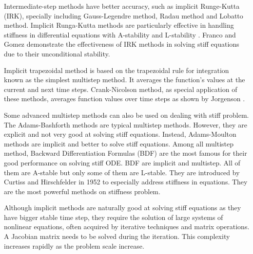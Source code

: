Intermediate-step methods have better accuracy, such as implicit Runge-Kutta (IRK), specially including Gauss-Legendre method, Radau method and Lobatto method. Implicit Runga-Kutta methods are particularly effective in handling stiffness in differential equations with A-stability and L-stability \cite{alamri2022very,franco1997two}. Franco and Gomez \cite{franco1997two} demonstrate the effectiveness of IRK methods in solving stiff equations due to their unconditional stability.

Implicit trapezoidal method is based on the trapezoidal rule for integration known as the simplest multistep method. It averages the function's values at the current and next time steps. Crank-Nicolson method, as special application of these methods, averages function values over time steps as shown by Jorgenson \cite{jorgenson1unconditional}. 
 
Some advanced multistep methods can also be used on dealing with stiff problem. The Adams-Bashforth methods \cite{jorgenson1unconditional} are typical multistep methods. However, they are explicit and not very good at solving stiff equations. Instead, Adams-Moulton methods are implicit and better to solve stiff equations. Among all multistep method, Backward Differentiation Formulas (BDF) are the most famous for their good performance on solving stiff ODE. BDF are implicit and multistep. All of them are A-stable but only some of them are L-stable. They are introduced by Curtiss and Hirschfelder in 1952 \cite{curtiss1952integration} to especially address stiffness in equations. They are the most powerful methods on stiffness problem. 

Although implicit methods are naturally good at solving stiff equations as they have bigger stable time step, they require the solution of large systems of nonlinear equations, often acquired by iterative techniques and matrix operations. A Jacobian matrix needs to be solved during the iteration. This complexity increases rapidly as the problem scale increase. 

